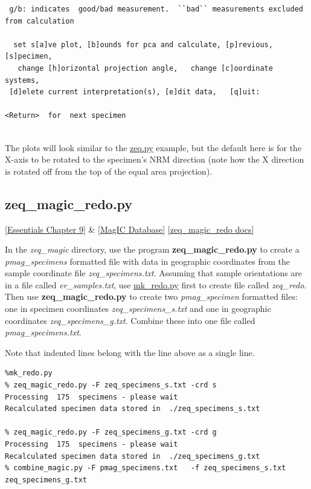 \documentclass[11pt]{book}
\begin{document}
{\begin{verbatim}
 g/b: indicates  good/bad measurement.  ``bad`` measurements excluded from calculation

  set s[a]ve plot, [b]ounds for pca and calculate, [p]revious, [s]pecimen,
   change [h]orizontal projection angle,   change [c]oordinate systems,
 [d]elete current interpretation(s), [e]dit data,   [q]uit:

<Return>  for  next specimen


\end{verbatim}

The plots will look similar to the \href{#zeq.py}{zeq.py} example, but the default here is for the X-axis to be rotated to the specimen's NRM direction (note how the X direction is rotated off from the top of the equal area projection).



\subsection{zeq\_magic\_redo.py}
\href{http://earthref.org/MAGIC/books/Tauxe/Essentials/WebBook3ch9.html#ch9}{[Essentials Chapter 9]}  \& \href{#MagICDatabase}{[MagIC Database]}
\href{https://github.com/PmagPy/PmagPy/blob/master/programs/zeq_magic_redo.py}{[zeq\_magic\_redo docs]}

In the {\it zeq\_magic} directory, use the program {\bf zeq\_magic\_redo.py} to create a {\it pmag\_specimens} formatted file with data in geographic coordinates from the sample coordinate file {\it zeq\_specimens.txt}.
Assuming that sample orientations are in a file called {\it er\_samples.txt}, use \href{#mk_redo.py}{mk\_redo.py} first to create file called {\it zeq\_redo}.  Then use
{\bf zeq\_magic\_redo.py} to create two {\it pmag\_specimen} formatted files:  one in specimen coordinates {\it zeq\_specimens\_s.txt} and one in geographic coordinates {\it zeq\_specimens\_g.txt}.   Combine these into one file called {\it pmag\_specimens.txt}.

Note that indented lines belong with the line above as a single line.

\begin{verbatim}
%mk_redo.py
% zeq_magic_redo.py -F zeq_specimens_s.txt -crd s
Processing  175  specimens - please wait
Recalculated specimen data stored in  ./zeq_specimens_s.txt

% zeq_magic_redo.py -F zeq_specimens_g.txt -crd g
Processing  175  specimens - please wait
Recalculated specimen data stored in  ./zeq_specimens_g.txt
% combine_magic.py -F pmag_specimens.txt   -f zeq_specimens_s.txt zeq_specimens_g.txt
\end{verbatim}

}
\end{document}
